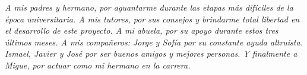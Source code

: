 


\textit{A mis padres y hermano, por aguantarme durante las etapas más difíciles de la época universitaria. A mis tutores, por sus consejos y brindarme total libertad en el desarrollo de este proyecto. A mi abuela, por su apoyo durante estos tres últimos meses. A mis compañeros: Jorge y Sofía por su constante ayuda altruista. Ismael, Javier y José por ser buenos amigos y mejores personas. Y finalmente a Migue, por actuar como mi hermano en la carrera.}

\restoregeometry